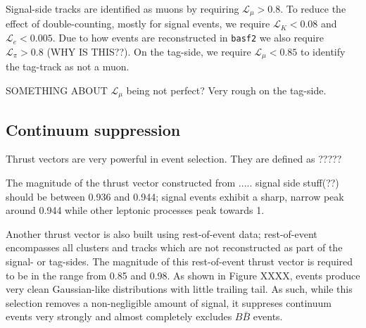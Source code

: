 \documentclass[12pt]{thesis}  %
\begin{document}
Signal-side tracks are identified as muons by requiring $\mathcal{L}_{\mu} > 0.8$. To reduce the effect of double-counting, mostly for signal events, we require $\mathcal{L}_{K} < 0.08$ and $\mathcal{L}_{e} < 0.005$. Due to how events are reconstructed in \texttt{basf2} we also require $\mathcal{L}_{\pi} > 0.8$ (WHY IS THIS??). On the tag-side, we require $\mathcal{L}_{\mu} < 0.85$ to identify the tag-track as not a muon.

SOMETHING ABOUT $\mathcal{L}_{\mu}$ being not perfect? Very rough on the tag-side.


\subsection{Continuum suppression}

Thrust vectors are very powerful in event selection. They are defined as ?????

The magnitude of the thrust vector constructed from ..... signal side stuff(??) should be between \num{0.936} and \num{0.944}; signal events exhibit a sharp, narrow peak around \num{0.944} while other leptonic processes peak towards \num{1}.

Another thrust vector is also built using rest-of-event data; rest-of-event encompasses all clusters and tracks which are not reconstructed as part of the signal- or tag-sides. The magnitude of this rest-of-event thrust vector is required to be in the range from \num{0.85} and \num{0.98}. As shown in Figure XXXX, events produce very clean Gaussian-like distributions with little trailing tail. As such, while this selection removes a non-negligible amount of signal, it suppreses continuum events very strongly and almost completely excludes $B\bar{B}$ events. 
\end{document}
